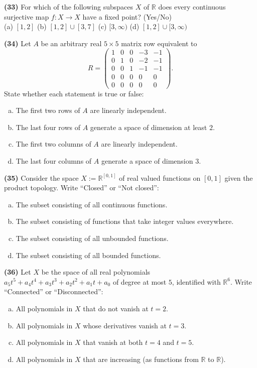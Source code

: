 \documentclass[11pt,a4paper]{article}
\newcommand{\R}{\mathbb{R}}
\newcommand{\qitem}[1]{\par\medskip\noindent\textbf{#1}\hspace{0.5em}}
\begin{document}
\qitem{(33)} For which of the following subspaces $X$ of $\R$ does every continuous surjective map $f : X \to X$ have a fixed point? (Yes/No)\\
(a) $[1, 2]$ \qquad (b) $[1, 2] \cup [3, 7]$ \qquad (c) $[3, \infty)$ \qquad (d) $[1, 2] \cup [3, \infty)$

\qitem{(34)} Let $A$ be an arbitrary real $5 \times 5$ matrix row equivalent to
\[
  R = \begin{pmatrix} 1 & 0 & 0 & -3 & -1 \\ 0 & 1 & 0 & -2 & -1 \\ 0 & 0 & 1 & -1 & -1 \\ 0 & 0 & 0 & 0 & 0 \\ 0 & 0 & 0 & 0 & 0 \end{pmatrix}.
\]
State whether each statement is true or false:
\begin{enumerate}[(a)]
  \item The first two rows of $A$ are linearly independent.
  \item The last four rows of $A$ generate a space of dimension at least $2$.
  \item The first two columns of $A$ are linearly independent.
  \item The last four columns of $A$ generate a space of dimension $3$.
\end{enumerate}

\qitem{(35)} Consider the space $X := \R^{[0,1]}$ of real valued functions on $[0, 1]$ given the product topology. Write ``Closed'' or ``Not closed'':
\begin{enumerate}[(a)]
  \item The subset consisting of all continuous functions.
  \item The subset consisting of functions that take integer values everywhere.
  \item The subset consisting of all unbounded functions.
  \item The subset consisting of all bounded functions.
\end{enumerate}

\qitem{(36)} Let $X$ be the space of all real polynomials $a_5 t^5 + a_4 t^4 + a_3 t^3 + a_2 t^2 + a_1 t + a_0$ of degree at most $5$, identified with $\R^6$. Write ``Connected'' or ``Disconnected'':
\begin{enumerate}[(a)]
  \item All polynomials in $X$ that do not vanish at $t = 2$.
  \item All polynomials in $X$ whose derivatives vanish at $t = 3$.
  \item All polynomials in $X$ that vanish at both $t = 4$ and $t = 5$.
  \item All polynomials in $X$ that are increasing (as functions from $\R$ to $\R$).
\end{enumerate}
\end{document}
